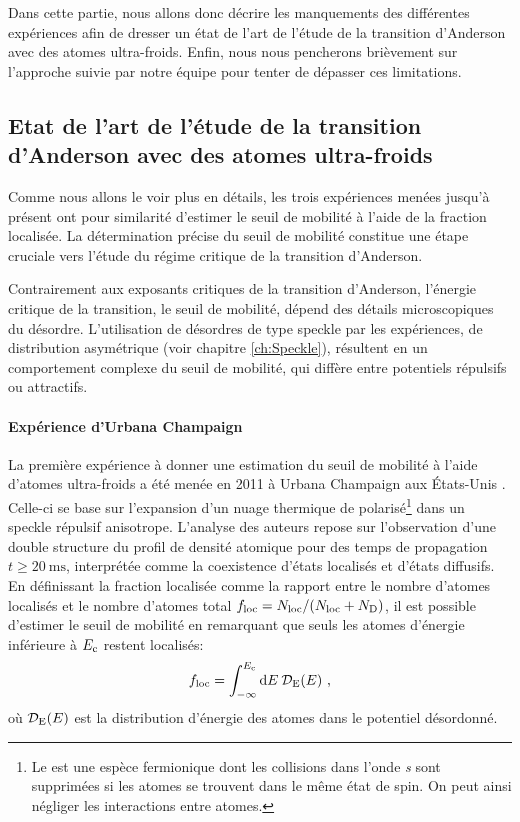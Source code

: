 Dans cette partie, nous allons donc décrire les manquements des différentes expériences afin de dresser un état de l'art de l'étude de la transition d'Anderson avec des atomes ultra-froids. Enfin, nous nous pencherons brièvement sur l'approche suivie par notre équipe pour tenter de dépasser ces limitations.

\subsection{Etat de l'art de l'étude de la transition d'Anderson avec des atomes ultra-froids}
Comme nous allons le voir plus en détails, les trois expériences menées jusqu'à présent ont pour similarité d'estimer le seuil de mobilité à l'aide de la fraction localisée. La détermination précise du seuil de mobilité constitue une étape cruciale vers l'étude du régime critique de la transition d'Anderson. 

Contrairement aux exposants critiques de la transition d'Anderson, l'énergie critique de la transition, le seuil de mobilité, dépend des détails microscopiques du désordre. L'utilisation de désordres de type speckle par les expériences, de distribution asymétrique (voir chapitre \ref{ch:Speckle}), résultent en un comportement complexe du seuil de mobilité, qui diffère entre potentiels répulsifs ou attractifs. 


\paragraph*{Expérience d'Urbana Champaign}
La première expérience à donner une estimation du seuil de mobilité à l'aide d'atomes ultra-froids a été menée en 2011 à Urbana Champaign aux États-Unis \citep{kondov2011three}. Celle-ci se base sur l'expansion d'un nuage thermique de  polarisé\footnote{Le  est une espèce fermionique dont les collisions dans l'onde \textit{s} sont supprimées si les atomes se trouvent dans le même état de spin. On peut ainsi négliger les interactions entre atomes.} dans un speckle répulsif anisotrope. L'analyse des auteurs repose sur l'observation d'une double structure du profil de densité atomique pour des temps de propagation $t\geq \SI{20}{\milli\second}$, interprétée comme la coexistence d'états localisés et d'états diffusifs. En définissant la fraction localisée comme la rapport entre le nombre d'atomes localisés et le nombre d'atomes total $f_{\mathrm{loc}}=N_{\mathrm{loc}}/(N_{\mathrm{loc}}+N_{\mathrm{D}})$, il est possible d'estimer le seuil de mobilité en remarquant que seuls les atomes d'énergie inférieure à $E_{\mathrm{c}}$ restent localisés:
\begin{equation}
f_{\mathrm{loc}}=\int_{-\infty}^{E_{\mathrm{c}}}{\mathrm{d}E \: \mathcal{D}_{\mathrm{E}}(E)} \text{ ,}
\label{eq:fraction_localisee}
\end{equation}
où $\mathcal{D}_{\mathrm{E}}(E)$ est la distribution d'énergie des atomes dans le potentiel désordonné.

